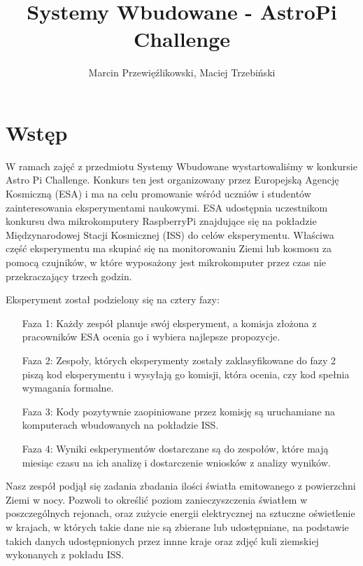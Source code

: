 \documentclass[12pt, a4paper]{report}
\title{Systemy Wbudowane - AstroPi Challenge}
\author{Marcin Przewięźlikowski, Maciej Trzebiński}
\begin{document}
    \maketitle

    \tableofcontents{}

    \chapter{Wstęp}\label{ch:introduction}

    W ramach zajęć z przedmiotu Systemy Wbudowane wystartowaliśmy w konkursie Astro Pi
    Challenge. Konkurs ten jest organizowany przez Europejską Agencję Kosmiczną (ESA) i ma na celu
    promowanie wśród uczniów i studentów zainteresowania eksperymentami naukowymi. ESA udostępnia
    uczestnikom konkursu dwa mikrokomputery RaspberryPi znajdujące się na pokładzie Międzynarodowej
    Stacji Kosmicznej (ISS) do celów eksperymentu. Właściwa część eksperymentu ma skupiać się na
    monitorowaniu Ziemi lub kosmosu za pomocą czujników, w które wyposażony jest mikrokomputer przez
    czas nie przekraczający trzech godzin.

    Eksperyment został podzielony się na cztery fazy:
    \begin{itemize}
        \item[Faza 1:] Każdy zespół planuje swój eksperyment, a komisja złożona z pracowników
        ESA ocenia go i wybiera najlepsze propozycje.
        \item[Faza 2:] Zespoły, których eksperymenty zostały zaklasyfikowane do fazy 2 piszą kod eksperymentu
        i wysyłają go komisji, która ocenia, czy kod spełnia wymagania formalne.
        \item[Faza 3:] Kody pozytywnie zaopiniowane przez komisję są uruchamiane na komputerach wbudowanych na pokładzie
        ISS.
        \item[Faza 4:] Wyniki eskperymentów dostarczane są do zespołów, które mają miesiąc czasu na ich analizę i
        dostarczenie wniosków z analizy wyników.
    \end{itemize}

    Nasz zespół podjął się zadania zbadania ilości światła emitowanego z powierzchni Ziemi w nocy.
    Pozwoli to określić poziom zanieczyszczenia światłem w poszczególnych rejonach, oraz zużycie energii
    elektrycznej na sztuczne oświetlenie w krajach, w których takie dane nie są zbierane lub udostępniane,
    na podstawie takich danych udostępnionych przez innne kraje oraz zdjęć kuli ziemskiej wykonanych z pokładu ISS.
\end{document}
